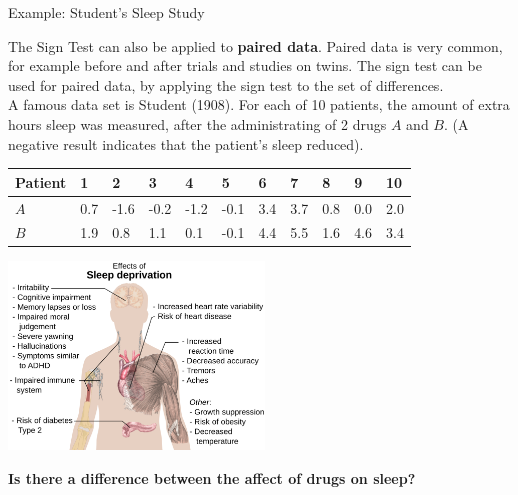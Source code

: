 \documentclass[t,xcolor=pdftex,dvipsnames,table]{beamer}\usepackage[]{graphicx}\usepackage[]{color}
\begin{document}
\begin{frame}{Example: Student's Sleep Study}

The Sign Test can also be applied to {\bf paired data}. Paired data is very common, for example before and after trials and studies on twins. The sign test can be used for paired data, by applying the sign test to the set of differences. \\

\vspace{.5cm}
A famous data set is Student (1908). For each of 10 patients, the amount of extra hours sleep was measured, after the administrating of 2 drugs $A$ and $B$. (A negative result indicates that the patient’s sleep reduced).  \href{https://stat.ethz.ch/R-manual/R-devel/library/datasets/html/sleep.html}{}  \\

\vspace{.5cm}
{\small \begin{tabular}{lllllllllll} \hline
Patient & 1 & 2 & 3 & 4 & 5 & 6 & 7 & 8 & 9 & 10 \\ \hline
$A$ & 0.7 & -1.6 & -0.2 & -1.2 & -0.1 & 3.4 & 3.7 & 0.8 & 0.0 & 2.0 \\
$B$ & 1.9 & 0.8 & 1.1 & 0.1 & -0.1 & 4.4 & 5.5 & 1.6 & 4.6 & 3.4 \\  \hline
\end{tabular}}
\end{frame}

\begin{frame}{}

\begin{center}
\includegraphics[height=5cm]{../images/Sleep.png}
\end{center}

{\bf Is there a difference between the affect of drugs on sleep?}

\end{frame}
\end{document}
